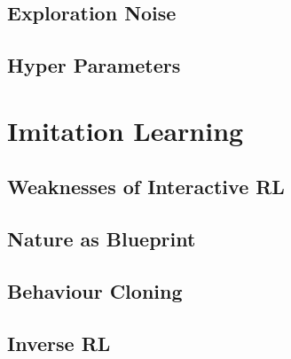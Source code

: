     \subsection{Exploration Noise}
    
    \subsection{Hyper Parameters}
    
\section{Imitation Learning}
    
        \subsection{Weaknesses of Interactive RL}
         \label{subchap:weak}
        \subsection{Nature as Blueprint}
        
        \subsection{Behaviour Cloning}
        
        \subsection{Inverse RL}
        
